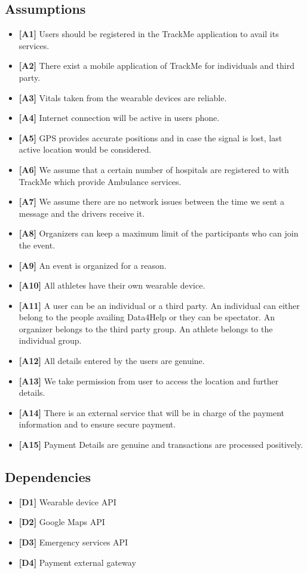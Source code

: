 \subsection{Assumptions}
\begin{itemize}
\item \textbf{[A1]} Users should be registered in the TrackMe application to avail its services.
\item \textbf{[A2]} There exist a mobile application of TrackMe for individuals and third party.
\item \textbf{[A3]} Vitals taken from the wearable devices are reliable. 
\item \textbf{[A4]} Internet connection will be active in users phone. 
\item \textbf{[A5]} GPS provides accurate positions and in case the signal is lost, last active location would be considered.
\item \textbf{[A6]} We assume that a certain number of hospitals are registered to with TrackMe which provide Ambulance services.
\item \textbf{[A7]} We assume there are no network issues between the time we sent a message and the drivers receive it.
\item \textbf{[A8]} Organizers can keep a maximum limit of the participants who can join the event.
\item \textbf{[A9]} An event is organized for a reason.
\item \textbf{[A10]} All athletes have their own wearable device.
\item \textbf{[A11]} A user can be an individual or a third party. An individual can either belong to the people availing Data4Help or they can be spectator. An organizer belongs to the third party group. An athlete belongs to the individual group.
\item \textbf{[A12]} All details entered by the users are genuine.
\item \textbf{[A13]} We take permission from user to access the location and further details.
\item \textbf{[A14]} There is an external service that will be in charge of the payment information and to ensure secure payment.
\item \textbf{[A15]} Payment Details are genuine and transactions are processed positively.
\end{itemize}

\subsection{Dependencies}
\begin{itemize}
\item{\textbf{[D1]}} Wearable device API
\item{\textbf{[D2]}} Google Maps API
\item{\textbf{[D3]}} Emergency services API
\item{\textbf{[D4]}} Payment external gateway
\end{itemize}


